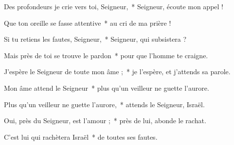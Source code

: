 \item Des profondeurs je crie vers toi, Seigneur,~* Seigneur, écoute mon appel !

\item Que ton oreille se fasse attentive~* au cri de ma prière !

\item Si tu retiens les fautes, Seigneur,~* Seigneur, qui subsistera ?

\item Mais près de toi se trouve le pardon~* pour que l'homme te craigne.

\item J'espère le Seigneur de toute mon âme ;~* je l'espère, et j'attends sa parole.

\item Mon âme attend le Seigneur~* plus qu'un veilleur ne guette l'aurore.

\item Plus qu'un veilleur ne guette l'aurore,~* attends le Seigneur, Israël.

\item Oui, près du Seigneur, est l'amour ;~* près de lui, abonde le rachat.

\item C'est lui qui rachètera Israël~* de toutes ses fautes.